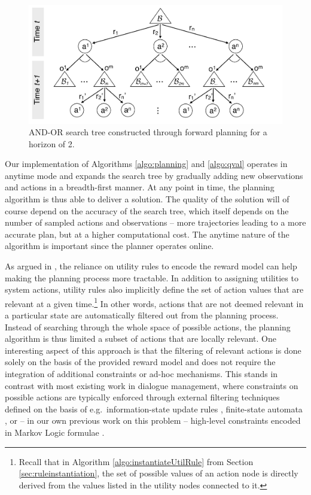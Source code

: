 \begin{figure}[h!]
\centering
\includegraphics[scale=0.30]{imgs/andortree.pdf}
\caption{AND-OR search tree constructed through forward planning for a horizon of 2.}
\label{fig:andortree}
\end{figure}

Our implementation of Algorithms \ref{algo:planning} and \ref{algo:qval} operates in anytime mode and expands the search tree by gradually adding new observations and actions in a breadth-first manner. At any point in time, the planning algorithm is thus able to deliver a solution. The quality of the solution will of course depend on the accuracy of the search tree, which itself depends on the number of sampled actions and observations -- more trajectories leading to a more accurate plan, but at a higher computational cost.  The anytime nature of the algorithm is important since the planner operates online.

As argued in \cite{onlineplanning-iwsds2012}, the reliance on utility rules to encode the reward model can help making the planning process more tractable.  In addition to assigning utilities to system actions, utility rules also implicitly define the set of action values that are relevant at a given time.\footnote{Recall that in Algorithm \ref{algo:instantiateUtilRule} from Section \ref{sec:ruleinstantiation}, the set of possible values of an action node is directly derived from the values listed in the utility nodes connected to it.} In other words, actions that are not deemed relevant in a particular state are automatically filtered out from the planning process.  Instead of searching through the whole space of possible actions, the planning algorithm is thus limited a subset of actions that are locally relevant.  One interesting aspect of this approach is that the filtering of relevant actions is done solely on the basis of the provided reward model and does not require the integration of additional constraints or ad-hoc mechanisms. This stands in contrast with most existing work in dialogue management, where constraints on possible actions are typically enforced through external filtering techniques defined on the basis of e.g.\ information-state update rules \citep{heeman2007}, finite-state automata \citep{williams2008}, or -- in our own previous work on this problem -- high-level constraints encoded in Markov Logic formulae \citep{srw-acl2010}. 

